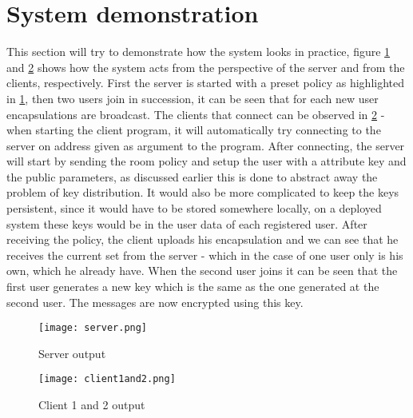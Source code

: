 \section{System demonstration}
This section will try to demonstrate how the system looks in practice, figure \ref{fig:server-output} and \ref{fig:client12-output} shows how the system acts from the perspective of the server and from the clients, respectively. First the server is started with a preset policy as highlighted in \ref{fig:server-output}, then two users join in succession, it can be seen that for each new user encapsulations are broadcast. The clients that connect can be observed in \ref{fig:client12-output} - when starting the client program, it will automatically try connecting to the server on address given as argument to the program. After connecting, the server will start by sending the room policy and setup the user with a attribute key and the public parameters, as discussed earlier this is done to abstract away the problem of key distribution. It would also be more complicated to keep the keys persistent, since it would have to be stored somewhere locally, on a deployed system these keys would be in the user data of each registered user. After receiving the policy, the client uploads his encapsulation and we can see that he receives the current set from the server - which in the case of one user only is his own, which he already have. When the second user joins it can be seen that the first user generates a new key which is the same as the one generated at the second user. The messages are now encrypted using this key.
\begin{figure}
\centering
\texttt{[image: server.png]}
\caption{Server output}
\label{fig:server-output}
\end{figure}

\begin{figure}
\centering
\texttt{[image: client1and2.png]}
\caption{Client 1 and 2 output}
\label{fig:client12-output}
\end{figure}

